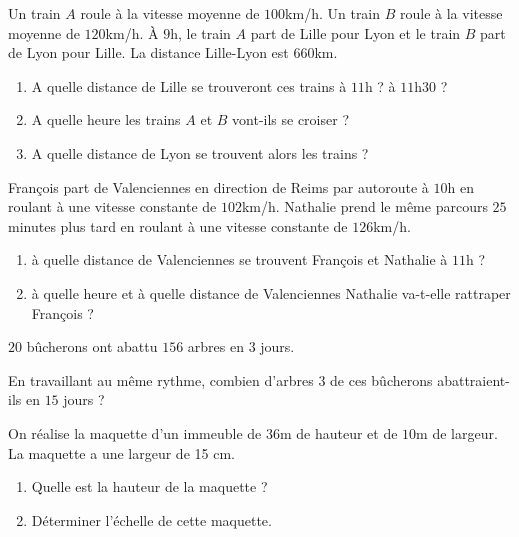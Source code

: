 \documentclass[a4paper,10pt]{report}
\begin{document}
\begin{ex}
Un train $A$ roule à la vitesse moyenne de $100$km/h. Un train $B$ roule à la vitesse moyenne de $120$km/h.
À $9$h, le train $A$ part de Lille pour Lyon et le train $B$ part de Lyon pour Lille.
La distance Lille-Lyon est $660$km.
\begin{enumerate}[font=\color{exer2}]
\item A quelle distance de Lille se trouveront ces trains à $11$h ? à $11$h$30$ ?
\item A quelle heure les trains $A$ et $B$ vont-ils se croiser ?
\item A quelle distance de Lyon se trouvent alors les trains ?
\end{enumerate}
\end{ex}

\begin{ex}
François part de Valenciennes en direction de Reims par autoroute à $10$h en roulant à une vitesse constante de $102$km/h. Nathalie prend le même parcours $25$minutes plus tard en roulant à une vitesse constante de $126$km/h.
\begin{enumerate}[font=\color{exer2}]
\item à quelle distance de Valenciennes se trouvent François et Nathalie à $11$h ?
\item à quelle heure et à quelle distance de Valenciennes Nathalie va-t-elle rattraper François ?
\end{enumerate}
\end{ex}

\begin{ex}
$20$ bûcherons ont abattu $156$ arbres en $3$ jours.

\medskip 
\noindent En travaillant au même rythme, combien d'arbres $3$ de ces bûcherons abattraient-ils en $15$ jours ?
\end{ex}

\begin{ex}
On réalise la maquette d'un immeuble de $36$m de hauteur et de $10$m de largeur. La maquette a une largeur de 15 cm.
\begin{enumerate}[font=\color{exer2}]
\item Quelle est la hauteur de la maquette ?
\item Déterminer l'échelle de cette maquette.
\end{enumerate}
\end{ex}
\end{document}
